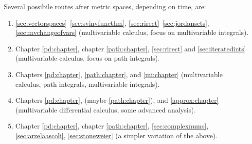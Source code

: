 Several possibile routes after metric spaces,
depending on time, are:
\begin{enumerate}[1)]
\item
\ref{sec:vectorspaces}--\ref{sec:svinvfuncthm},
\ref{sec:rirect}--\ref{sec:jordansets}, \ref{sec:mvchangeofvars}
(multivariable calculus, focus on multivariable integrals).
\item
Chapter \ref{pd:chapter}, chapter \ref{path:chapter},
\ref{sec:rirect} and \ref{sec:iteratedints}
(multivariable calculus, focus on path integrals).
\item Chapters \ref{pd:chapter}, \ref{path:chapter}, and
\ref{mi:chapter}
(multivariable calculus, path integrals, multivariable integrals).
\item
Chapters \ref{pd:chapter}, (maybe \ref{path:chapter}), and \ref{approx:chapter}
(multivariable differential calculus, some advanced analysis).
\item
Chapter \ref{pd:chapter}, chapter \ref{path:chapter}, 
\ref{sec:complexnums},
\ref{sec:arzelaascoli},
\ref{sec:stoneweier}
(a simpler variation of the above).
\end{enumerate}

